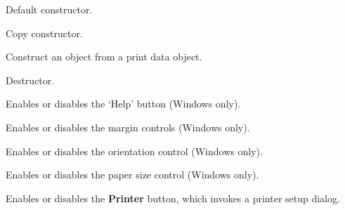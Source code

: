 
Default constructor.


Copy constructor.


Construct an object from a print data object.

\label{wxpagesetupdialogdatadtor}


Destructor.

\label{wxpagesetupdialogdataenablehelp}


Enables or disables the `Help' button (Windows only).

\label{wxpagesetupdialogdataenablemargins}


Enables or disables the margin controls (Windows only).

\label{wxpagesetupdialogdataenableorientation}


Enables or disables the orientation control (Windows only).

\label{wxpagesetupdialogdataenablepaper}


Enables or disables the paper size control (Windows only).

\label{wxpagesetupdialogdataenableprinter}


Enables or disables the {\bf Printer} button, which invokes a printer setup dialog.

\label{wxpagesetupdialogdatagetdefaultminmargins}


